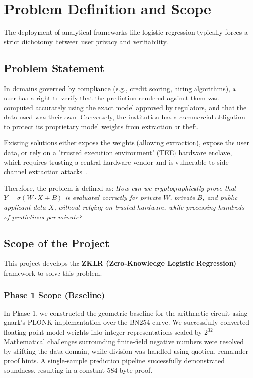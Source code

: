 \chapter{Problem Definition and Scope}

The deployment of analytical frameworks like logistic regression typically forces a strict dichotomy between user privacy and verifiability. 

\section{Problem Statement}
In domains governed by compliance (e.g., credit scoring, hiring algorithms), a user has a right to verify that the prediction rendered against them was computed accurately using the exact model approved by regulators, and that the data used was their own. Conversely, the institution has a commercial obligation to protect its proprietary model weights from extraction or theft.

Existing solutions either expose the weights (allowing extraction), expose the user data, or rely on a "trusted execution environment" (TEE) hardware enclave, which requires trusting a central hardware vendor and is vulnerable to side-channel extraction attacks~\cite{10.1145/3372297.3417278}. 

Therefore, the problem is defined as: \emph{How can we cryptographically prove that $Y = \sigma(W \cdot X + B)$ is evaluated correctly for private $W$, private $B$, and public applicant data $X$, without relying on trusted hardware, while processing hundreds of predictions per minute?}

\section{Scope of the Project}
This project develops the \textbf{ZKLR (Zero-Knowledge Logistic Regression)} framework to solve this problem.

\subsection{Phase 1 Scope (Baseline)}
In Phase 1, we constructed the geometric baseline for the arithmetic circuit using gnark's PLONK implementation over the BN254 curve. We successfully converted floating-point model weights into integer representations scaled by $2^{32}$. Mathematical challenges surrounding finite-field negative numbers were resolved by shifting the data domain, while division was handled using quotient-remainder proof hints. A single-sample prediction pipeline successfully demonstrated soundness, resulting in a constant 584-byte proof.

